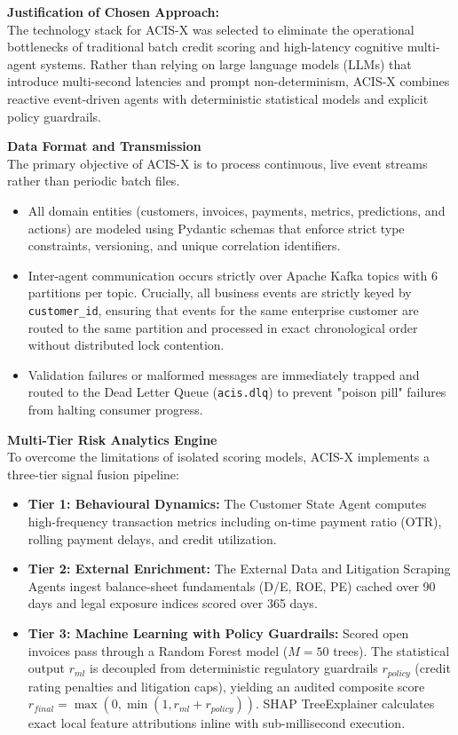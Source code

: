 \documentclass[a4paper, 12pt]{report}
\begin{document}
\noindent \textbf{Justification of Chosen Approach:} \\
The technology stack for ACIS-X was selected to eliminate the operational bottlenecks of traditional batch credit scoring and high-latency cognitive multi-agent systems. Rather than relying on large language models (LLMs) that introduce multi-second latencies and prompt non-determinism, ACIS-X combines reactive event-driven agents with deterministic statistical models and explicit policy guardrails.

\noindent \textbf{Data Format and Transmission} \\
The primary objective of ACIS-X is to process continuous, live event streams rather than periodic batch files. 
\begin{itemize}[itemsep=2pt]
    \item All domain entities (customers, invoices, payments, metrics, predictions, and actions) are modeled using Pydantic schemas that enforce strict type constraints, versioning, and unique correlation identifiers.
    \item Inter-agent communication occurs strictly over Apache Kafka topics with 6 partitions per topic. Crucially, all business events are strictly keyed by \texttt{customer\_id}, ensuring that events for the same enterprise customer are routed to the same partition and processed in exact chronological order without distributed lock contention.
    \item Validation failures or malformed messages are immediately trapped and routed to the Dead Letter Queue (\texttt{acis.dlq}) to prevent "poison pill" failures from halting consumer progress.
\end{itemize}

\noindent \textbf{Multi-Tier Risk Analytics Engine} \\
To overcome the limitations of isolated scoring models, ACIS-X implements a three-tier signal fusion pipeline:
\begin{itemize}[itemsep=2pt]
    \item \textbf{Tier 1: Behavioural Dynamics:} The Customer State Agent computes high-frequency transaction metrics including on-time payment ratio (OTR), rolling payment delays, and credit utilization.
    \item \textbf{Tier 2: External Enrichment:} The External Data and Litigation Scraping Agents ingest balance-sheet fundamentals (D/E, ROE, PE) cached over 90 days and legal exposure indices scored over 365 days.
    \item \textbf{Tier 3: Machine Learning with Policy Guardrails:} Scored open invoices pass through a Random Forest model ($M=50$ trees). The statistical output $r_{ml}$ is decoupled from deterministic regulatory guardrails $r_{policy}$ (credit rating penalties and litigation caps), yielding an audited composite score $r_{final} = \max(0, \min(1, r_{ml} + r_{policy}))$. SHAP TreeExplainer calculates exact local feature attributions inline with sub-millisecond execution.
\end{itemize}
\end{document}

